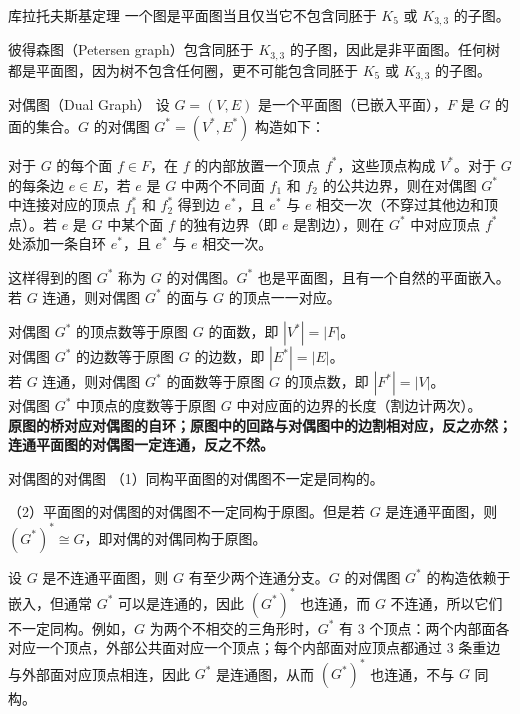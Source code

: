 \begin{theorem}{库拉托夫斯基定理}{}
    一个图是平面图当且仅当它不包含同胚于 $K_5$ 或 $K_{3,3}$ 的子图。
\end{theorem}
彼得森图（Petersen graph）包含同胚于 $K_{3,3}$ 的子图，因此是非平面图。任何树都是平面图，因为树不包含任何圈，更不可能包含同胚于 $K_5$ 或 $K_{3,3}$ 的子图。
\begin{definition}{对偶图（Dual Graph）}{}
设 $G=(V,E)$ 是一个平面图（已嵌入平面），$F$ 是 $G$ 的面的集合。$G$ 的对偶图 $G^*=(V^*,E^*)$ 构造如下：

对于 $G$ 的每个面 $f \in F$，在 $f$ 的内部放置一个顶点 $f^*$，这些顶点构成 $V^*$。对于 $G$ 的每条边 $e \in E$，若 $e$ 是 $G$ 中两个不同面 $f_1$ 和 $f_2$ 的公共边界，则在对偶图 $G^*$ 中连接对应的顶点 $f_1^*$ 和 $f_2^*$ 得到边 $e^*$，且 $e^*$ 与 $e$ 相交一次（不穿过其他边和顶点）。若 $e$ 是 $G$ 中某个面 $f$ 的独有边界（即 $e$ 是割边），则在 $G^*$ 中对应顶点 $f^*$ 处添加一条自环 $e^*$，且 $e^*$ 与 $e$ 相交一次。

这样得到的图 $G^*$ 称为 $G$ 的对偶图。$G^*$ 也是平面图，且有一个自然的平面嵌入。若 $G$ 连通，则对偶图 $G^*$ 的面与 $G$ 的顶点一一对应。
\end{definition}
对偶图 $G^*$ 的顶点数等于原图 $G$ 的面数，即 $|V^*| = |F|$。\\
对偶图 $G^*$ 的边数等于原图 $G$ 的边数，即 $|E^*| = |E|$。\\
若 $G$ 连通，则对偶图 $G^*$ 的面数等于原图 $G$ 的顶点数，即 $|F^*| = |V|$。\\
对偶图 $G^*$ 中顶点的度数等于原图 $G$ 中对应面的边界的长度（割边计两次）。\\
\textbf{原图的桥对应对偶图的自环；原图中的回路与对偶图中的边割相对应，反之亦然；连通平面图的对偶图一定连通，反之不然。}
\begin{theorem}{对偶图的对偶图}{}
（1）同构平面图的对偶图不一定是同构的。

（2）平面图的对偶图的对偶图不一定同构于原图。但是若 $G$ 是连通平面图，则 $(G^*)^* \cong G$，即对偶的对偶同构于原图。
\end{theorem}
设 $G$ 是不连通平面图，则 $G$ 有至少两个连通分支。$G$ 的对偶图 $G^*$ 的构造依赖于嵌入，但通常 $G^*$ 可以是连通的，因此 $(G^*)^*$ 也连通，而 $G$ 不连通，所以它们不一定同构。例如，$G$ 为两个不相交的三角形时，$G^*$ 有 3 个顶点：两个内部面各对应一个顶点，外部公共面对应一个顶点；每个内部面对应顶点都通过 3 条重边与外部面对应顶点相连，因此 $G^*$ 是连通图，从而 $(G^*)^*$ 也连通，不与 $G$ 同构。

